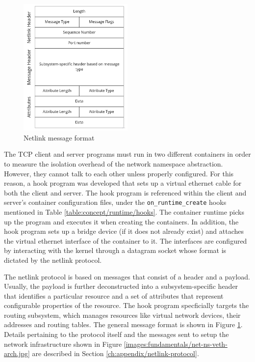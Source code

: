 \begin{figure}[H]
    \centering
    \includegraphics[width=0.5\textwidth]{images/implementation/netlink-message.jpg}
    \caption{Netlink message format}
    \label{images:implementation/netlink-message.jpg}
\end{figure}

The TCP client and server programs must run in two different containers in order to measure 
the isolation overhead of the network namespace abstraction. However, they cannot talk to each other 
unless properly configured. For this reason, a hook program was developed that sets up a virtual 
ethernet cable for both the client and server. The hook program is referenced within the 
client and server's container configuration files, under the \verb|on_runtime_create| hooks mentioned in Table \ref{table:concept/runtime/hooks}. 
The container runtime picks up the program and executes it when creating the containers.
In addition, the hook program sets up a bridge device (if it does not already exist) and attaches 
the virtual ethernet interface of the container to it. 
The interfaces are configured by interacting with the kernel through a datagram socket whose format 
is dictated by the netlink protocol.

The netlink protocol is based on messages that consist of a header and a payload.
Usually, the payload is further deconstructed into a subsystem-specific header that identifies 
a particular resource and a set of attributes that represent configurable properties of the resource.
The hook program specficially targets the routing subsystem, which manages resources like 
virtual network devices, their addresses and routing tables. The general message format 
is shown in Figure \ref{images:implementation/netlink-message.jpg}. Details pertaining to the protocol itself and the messages sent 
to setup the network infrastructure shown in Figure \ref{images:fundamentals/net-ns-veth-arch.jpg}
are described in Section \ref{ch:appendix/netlink-protocol}. 

